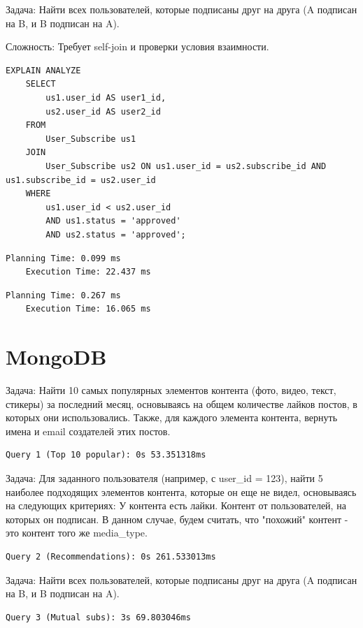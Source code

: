 \documentclass{article}
\begin{document}
Задача: Найти всех пользователей, которые подписаны друг на друга (A подписан на B, и B подписан на A).

Сложность: Требует self-join и проверки условия взаимности.
\begin{lstlisting}[caption={subs}, label={lst:example}]
    EXPLAIN ANALYZE
    SELECT
        us1.user_id AS user1_id,
        us2.user_id AS user2_id
    FROM
        User_Subscribe us1
    JOIN
        User_Subscribe us2 ON us1.user_id = us2.subscribe_id AND us1.subscribe_id = us2.user_id
    WHERE
        us1.user_id < us2.user_id  
        AND us1.status = 'approved'
        AND us2.status = 'approved';
\end{lstlisting}
\begin{lstlisting}[caption={explain analyze without indexes}, label={lst:example}]
    Planning Time: 0.099 ms
    Execution Time: 22.437 ms
\end{lstlisting}
\begin{lstlisting}[caption={explain analyze with indexes}, label={lst:example}]
    Planning Time: 0.267 ms
    Execution Time: 16.065 ms
\end{lstlisting}

\section*{MongoDB}

Задача: Найти 10 самых популярных элементов контента (фото, видео, текст, стикеры) за последний месяц, 
основываясь на общем количестве лайков постов, в которых они использовались. 
Также, для каждого элемента контента, вернуть имена и email создателей этих постов.
\begin{lstlisting}[caption={analyze without indexes}, label={lst:example}]
    Query 1 (Top 10 popular): 0s 53.351318ms
\end{lstlisting}

Задача: Для заданного пользователя (например, с user\_id = 123), найти 5 наиболее подходящих элементов контента,
которые он еще не видел, основываясь на следующих критериях:
У контента есть лайки.
Контент от пользователей, на которых он подписан.
В данном случае, будем считать, что "похожий" контент - это контент того же media\_type.
\begin{lstlisting}[caption={analyze without indexes}, label={lst:example}]
    Query 2 (Recommendations): 0s 261.533013ms
\end{lstlisting}


Задача: Найти всех пользователей, которые подписаны друг на друга (A подписан на B, и B подписан на A).
\begin{lstlisting}[caption={analyze without indexes}, label={lst:example}]
    Query 3 (Mutual subs): 3s 69.803046ms
\end{lstlisting}
\end{document}
